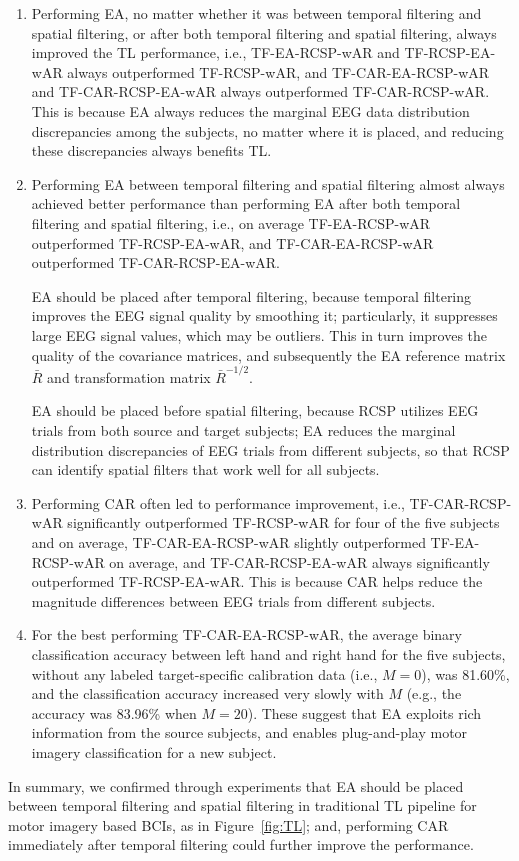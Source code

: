 \documentclass[journal]{IEEEtran}
\begin{document}
\begin{enumerate}
\item Performing EA, no matter whether it was between temporal filtering and spatial filtering, or after both temporal filtering and spatial filtering, always improved the TL performance, i.e., TF-EA-RCSP-wAR and TF-RCSP-EA-wAR always outperformed TF-RCSP-wAR, and TF-CAR-EA-RCSP-wAR and TF-CAR-RCSP-EA-wAR always outperformed TF-CAR-RCSP-wAR. This is because EA always reduces the marginal EEG data distribution discrepancies among the subjects, no matter where it is placed, and reducing these discrepancies always benefits TL.

\item Performing EA between temporal filtering and spatial filtering almost always achieved better performance than performing EA after both temporal filtering and spatial filtering, i.e., on average TF-EA-RCSP-wAR outperformed TF-RCSP-EA-wAR, and TF-CAR-EA-RCSP-wAR outperformed TF-CAR-RCSP-EA-wAR.

    EA should be placed after temporal filtering, because temporal filtering improves the EEG signal quality by smoothing it; particularly, it suppresses large EEG signal values, which may be outliers. This in turn improves the quality of the covariance matrices, and subsequently the EA reference matrix $\bar{R}$ and transformation matrix $\bar{R}^{-1/2}$.

    EA should be placed before spatial filtering, because RCSP utilizes EEG trials from both source and target subjects; EA reduces the marginal distribution discrepancies of EEG trials from different subjects, so that RCSP can identify spatial filters that work well for all subjects.

\item Performing CAR often led to performance improvement, i.e., TF-CAR-RCSP-wAR significantly outperformed TF-RCSP-wAR for four of the five subjects and on average, TF-CAR-EA-RCSP-wAR slightly outperformed TF-EA-RCSP-wAR on average, and TF-CAR-RCSP-EA-wAR always significantly outperformed TF-RCSP-EA-wAR. This is because CAR helps reduce the magnitude differences between EEG trials from different subjects.

\item For the best performing TF-CAR-EA-RCSP-wAR, the average binary classification accuracy between left hand and right hand for the five subjects, without any  labeled target-specific calibration data (i.e., $M=0$), was 81.60\%, and the classification accuracy increased very slowly with $M$ (e.g., the accuracy was 83.96\% when $M=20$). These suggest that EA exploits rich information from the source subjects, and enables plug-and-play motor imagery classification for a new subject.
\end{enumerate}
In summary, we confirmed through experiments that EA should be placed between temporal filtering and spatial filtering in traditional TL pipeline for motor imagery based BCIs, as in Figure~\ref{fig:TL}; and, performing CAR immediately after temporal filtering could further improve the performance.
\end{document}
